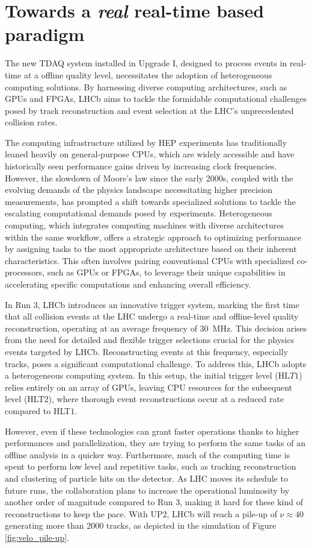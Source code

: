 \section{Towards a \textit{real} real-time based paradigm}
The new TDAQ system installed in Upgrade I\cite{lhcbcollaboration2023lhcb}, designed to process events in real-time at a offline quality level, necessitates the adoption of heterogeneous computing solutions. By harnessing diverse computing architectures, such as GPUs and FPGAs, LHCb aims to tackle the formidable computational challenges posed by track reconstruction and event selection at the LHC's unprecedented collision rates.

The computing infrastructure utilized by HEP experiments has traditionally leaned heavily on general-purpose CPUs, which are widely accessible and have historically seen performance gains driven by increasing clock frequencies. However, the slowdown of Moore's law since the early 2000s\cite{Tuomi_2002}, coupled with the evolving demands of the physics landscape necessitating higher precision measurements, has prompted a shift towards specialized solutions to tackle the escalating computational demands posed by experiments. Heterogeneous computing, which integrates computing machines with diverse architectures within the same workflow, offers a strategic approach to optimizing performance by assigning tasks to the most appropriate architecture based on their inherent characteristics. This often involves pairing conventional CPUs with specialized co-processors, such as GPUs or FPGAs, to leverage their unique capabilities in accelerating specific computations and enhancing overall efficiency.

In Run 3, LHCb introduces an innovative trigger system, marking the first time that all collision events at the LHC undergo a real-time and offline-level quality reconstruction, operating at an average frequency of \SI{30}{\mega\hertz}. This decision arises from the need for detailed and flexible trigger selections crucial for the physics events targeted by LHCb. Reconstructing events at this frequency, especially tracks, poses a significant computational challenge. To address this, LHCb adopts a heterogeneous computing system. In this setup, the initial trigger level (HL$T1$) relies entirely on an array of GPUs, leaving CPU resources for the subsequent level (HLT$2$), where thorough event reconstructions occur at a reduced rate compared to HLT$1$. 

However, even if these technologies can grant faster operations thanks to higher performances and parallelization, they are trying to perform the same tasks of an offline analysis in a quicker way. Furthermore, much of the computing time is spent to perform low level and repetitive tasks, such as tracking reconstruction and clustering of particle hits on the detector. As LHC moves its schedule to future runs, the collaboration plans to increase the operational luminosity by another order of magnitude compared to Run 3, making it hard for these kind of reconstructions to keep the pace. With UP2, LHCb will reach a pile-up of $\nu\approx 40$ generating more than 2000 tracks, as depicted in the simulation of Figure \ref{fig:velo_pile-up}. 


